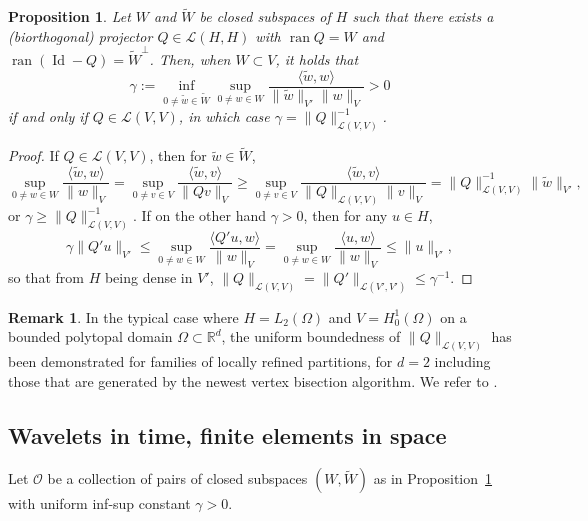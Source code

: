 \documentclass[11pt,a4paper,oneside,english]{amsart}
\numberwithin{equation}{section}
\numberwithin{theorem}{section}
\newtheorem{prop}[theorem]{Proposition}
\theoremstyle{definition}
\newtheorem{remark}[theorem]{Remark}
\newcommand{\R}{\mathbb{R}}
\newcommand{\la}{\langle}
\newcommand{\ra}{\rangle}
\DeclareMathOperator*{\Id}{Id}
\newcommand{\cL}{\mathcal L}
\newcommand{\jw}[1]{{\color{red}{JW: #1}}}
\DeclareMathOperator*{\ran}{ran}
\begin{document}
\begin{prop} \label{prop:space-infsup}
  Let $W$ and $\tilde W$ be closed subspaces of $H$ such that there exists a
  (biorthogonal) projector $Q \in \cL(H,H)$ with $\ran Q=W$ and $\ran (\Id -Q)={\tilde W}^\perp$.
  Then, when $W \subset V$, it holds that
  \[
    \gamma:=\inf_{0 \neq \tilde w \in \tilde W}\sup_{0 \neq w \in W}\frac{\la \tilde w,w\ra}{\|\tilde w\|_{V'}\|w\|_V}>0
  \]
  if and only if $Q \in \cL(V,V)$, in which case $\gamma=\|Q\|_{\cL(V,V)}^{-1}$.
\end{prop}
\begin{proof} If $Q\in \cL(V,V)$, then for $\tilde w \in \tilde W$,
$$
\sup_{0 \neq w \in W}\frac{\la \tilde w,w\ra}{\|w\|_V}=\sup_{0 \neq v \in V}\frac{\la \tilde w, v\ra}{\|Qv\|_V}
  \geq \sup_{0 \neq v \in V} \frac{\la \tilde w, v \ra}{\|Q\|_{\cL(V, V)} \|v\|_V} = \|Q\|_{\cL(V,V)}^{-1} \|\tilde w\|_{V'},
$$
or $\gamma \geq \|Q\|_{\cL(V,V)}^{-1}$. If on the other hand $\gamma>0$, then for any $u \in H$,
$$
\gamma \|Q' u\|_{V'} \leq \sup_{0 \neq w \in W}\frac{\la Q'u,w\ra}{\|w\|_V} =
 \sup_{0 \neq w \in W}\frac{\la u,w\ra}{\|w\|_V} \leq \|u\|_{V'},
 $$
so that from $H$ being dense in $V'$, $\|Q\|_{\cL(V,V)}=\|Q'\|_{\cL(V',V')}\leq \gamma^{-1}$.
\end{proof}
\begin{remark}
  In the typical case where $H = L_2(\Omega)$ and $V = H_0^1(\Omega)$ on a bounded
  polytopal domain $\Omega \subset \R^d$, the uniform boundedness of $\|Q\|_{\cL(V,V)}$
  has been demonstrated for families of locally refined partitions, for $d=2$
  including those that are generated by the newest vertex bisection algorithm.
  We refer to \cite{Carstensen2001a,Gaspoz2016}. \jw{Misschien is het ``$H^1$-stability
  of $L^2$-projection" inmiddels wel uitgespeeld. ik vond ook een werk uit
  2014 van de groep van Dirk, en dit werkte voor elke dimensie, maar enkel op
  vreemde fin.elts. Ook een werk uit 2019 van Gaspoz, Heine, Siebert waar het
  2d-NVB geval wordt bekeken voor Lagrange-fin elts tot graad 4.}
\end{remark}

\subsection{Wavelets in time, finite elements in space}
\jw{Willen we hier $\tilde Y^\delta$ houden ookal is hij gewoon $=Y^\delta$?}
Let ${\mathcal O}$ be a collection of pairs of closed subspaces $(W,\tilde{W})$
as in Proposition~\ref{prop:space-infsup} with uniform inf-sup constant $\gamma>0$.
\end{document}
